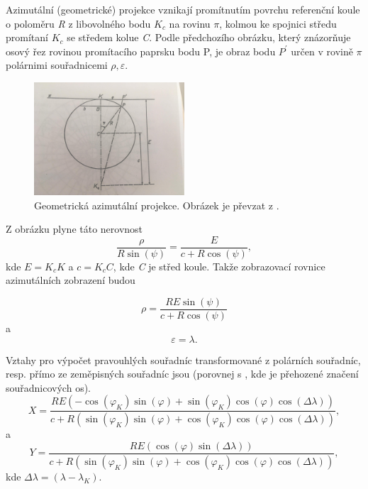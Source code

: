 \documentclass[11pt,a4paper]{article}
\begin{document}
Azimutální (geometrické) projekce vznikají promítnutím povrchu referenční koule o poloměru \textit{R} z libovolného bodu $K_{c}$ na rovinu $\pi$, kolmou ke spojnici středu promítaní $K_{c}$ se středem kolue \textit{C}. Podle předchozího obrázku, který znázorňuje osový řez rovinou promítacího paprsku bodu P, je obraz bodu $P^{'}$ určen v rovině $\pi$ polárnimi souřadnicemi $\rho, \varepsilon$.

\begin{figure}[ht!]
\begin{center}

\includegraphics[width=0.5\textwidth]{FIG/azimProj.jpg}
\caption{Geometrická azimutální projekce. Obrázek je převzat z \cite{Buchar2002}.}
\label{fig:azimProj}
\end{center}
\end{figure}

Z obrázku plyne táto nerovnost
\begin{equation}
\dfrac{\rho}{R\sin{\left(\psi\right)}} = \dfrac{E}{c+R\cos{\left(\psi\right)}},
\end{equation}
kde $E = K_{c}K$ a $c = K_{c}C$, kde \textit{C} je střed koule. Takže zobrazovací rovnice azimutálních zobrazení budou

\begin{equation}
\rho = \dfrac{RE\sin{\left(\psi\right)}}{c+R\cos{\left(\psi\right)}}
\end{equation}
a
\begin{equation}
\varepsilon = \lambda.
\end{equation}

Vztahy pro výpočet pravouhlých souřadníc transformované z polárních souřadníc, resp. přímo ze zeměpisných souřadníc jsou (porovnej s \cite{stereoWolf}, kde je přehozené značení souřadnicových os).
\begin{equation}
X = \dfrac{RE\left(-\cos{\left(\varphi_{K}\right)}\sin{\left(\varphi\right)}+\sin{\left(\varphi_{K}\right)}\cos{\left(\varphi\right)}\cos{\left(\Delta\lambda\right)}\right)}{c+R\left( \sin{\left(\varphi_{K}\right)}\sin{\left(\varphi\right)}+\cos{\left(\varphi_{K}\right)}\cos{\left(\varphi\right)}\cos{\left(\Delta\lambda\right)} \right)},
\end{equation}
a
\begin{equation}
Y = \dfrac{RE\left(\cos{\left(\varphi\right)}\sin{\left(\Delta\lambda\right)}\right)}{c+R\left( \sin{\left(\varphi_{K}\right)}\sin{\left(\varphi\right)}+\cos{\left(\varphi_{K}\right)}\cos{\left(\varphi\right)}\cos{\left(\Delta\lambda\right)} \right)},
\end{equation}
kde $\Delta\lambda = \left(\lambda - \lambda_{K}\right)$.
\end{document}
